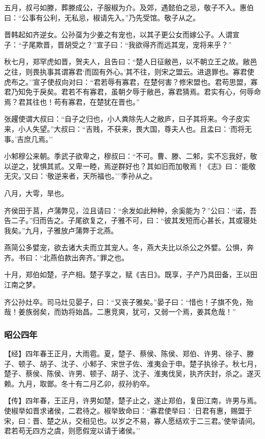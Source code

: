 \documentclass[]{article}
\begin{document}
五月，叔弓如滕，葬滕成公，子服椒为介。及郊，遇懿伯之忌，敬子不入。惠伯曰：``公事有公利，无私忌，椒请先入。''乃先受馆。敬子从之。

晋韩起如齐逆女。公孙虿为少姜之有宠也，以其子更公女而嫁公子。人谓宣子：``子尾欺晋，晋胡受之？''宣子曰：``我欲得齐而远其宠，宠将来乎？''

秋七月，郑罕虎如晋，贺夫人，且告曰：``楚人日征敝邑，以不朝立王之故。敝邑之往，则畏执事其谓寡君`而固有外心。'其不往，则宋之盟云。进退罪也。寡君使虎布之。''宣子使叔向对曰：``君若辱有寡君，在楚何害？修宋盟也。君苟思盟，寡君乃知免于戾矣。君若不有寡君，虽朝夕辱于敝邑，寡君猜焉。君实有心，何辱命焉？君其往也！苟有寡君，在楚犹在晋也。''

张趯使谓大叔曰：``自子之归也，小人粪除先人之敝庐，曰子其将来。今子皮实来，小人失望。''大叔曰：``吉贱，不获来，畏大国，尊夫人也。且孟曰：`而将无事。'吉庶几焉。''

小邾穆公来朝。季武子欲卑之，穆叔曰：``不可。曹、滕、二邾，实不忘我好，敬以逆之，犹惧其贰。又卑一睦，焉逆群好也？其如旧而加敬焉！《志》曰：`能敬无灾。'又曰：`敬逆来者，天所福也。'''季孙从之。

八月，大雩，旱也。

齐侯田于莒，卢蒲弊见，泣且请曰：``余发如此种种，余奚能为？''公曰：``诺，吾告二子。''归而告之。子尾欲复之，子雅不可，曰：``彼其发短而心甚长，其或寝处我矣。''九月，子雅放卢蒲弊于北燕。

燕简公多嬖宠，欲去诸大夫而立其宠人。冬，燕大夫比以杀公之外嬖。公惧，奔齐。书曰：``北燕伯款出奔齐。''罪之也。

十月，郑伯如楚，子产相。楚子享之，赋《吉日》。既享，子产乃具田备，王以田江南之梦。

齐公孙灶卒。司马灶见晏子，曰：``又丧子雅矣。''晏子曰：``惜也！子旗不免，殆哉！姜族弱矣，而妫将始昌。二惠竞爽，犹可，又弱一个焉，姜其危哉！''

\hypertarget{header-n2422}{%
\subsubsection{昭公四年}\label{header-n2422}}

【经】四年春王正月，大雨雹。夏，楚子、蔡侯、陈侯、郑伯、许男、徐子、滕子、顿子、胡子、沈子、小邾子、宋世子佐、淮夷会于申。楚子执徐子。秋七月，楚子、蔡侯、陈侯、许男、顿子、胡子、沈子、淮夷伐吴，执齐庆封，杀之。遂灭赖。九月，取鄫。冬十有二月乙卯，叔孙豹卒。

【传】四年春，王正月，许男如楚，楚子止之，遂止郑伯，复田江南，许男与焉。使椒举如晋求诸侯，二君待之。椒举致命曰：``寡君使举曰：`日君有惠，赐盟于宋，曰：晋、楚之从，交相见也。以岁之不易，寡人愿结欢于二三君。'使举请间。君若苟无四方之虞，则愿假宠以请于诸侯。''
\end{document}
